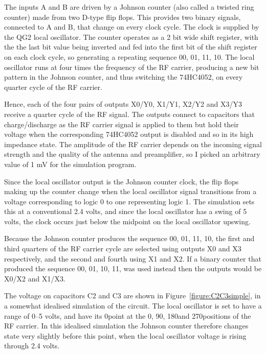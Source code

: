 \documentclass[11pt, twoside]{article}
\begin{document}
The inputs A and B are driven by a Johnson counter (also called a
twisted ring counter) made from two D-type flip flops.  This provides
two binary signals, connected to A and B, that change on every clock
cycle.  The clock is supplied by the QG2 local oscillator. The counter
operates as a 2 bit wide shift register, with the the last bit value
being inverted and fed into the first bit of the shift register on
each clock cycle, so generating a repeating sequence 00, 01, 11, 10.
The local oscillator runs at four times the frequency of the RF
carrier, producing a new bit pattern in the Johnson counter, and thus
switching the 74HC4052, on every quarter cycle of the RF carrier.

Hence, each of the four pairs of outputs X0/Y0, X1/Y1, X2/Y2 and X3/Y3
receive a quarter cycle of the RF signal.  The outputs connect to
capacitors that charge/discharge as the RF carrier signal is applied
to them but hold their voltage when the corresponding 74HC4052 output
is disabled and so in its high impedance state. The amplitude of the
RF carrier depends on the incoming signal strength and the quality of
the antenna and preamplifier, so I picked an arbitrary value of 1 mV
for the simulation program.

Since the local oscillator output is the Johnson counter clock, the
flip flops making up the counter change when the local oscillator
signal transitions from a voltage corresponding to logic 0 to one
representing logic 1.  The simulation sets this at a conventional 2.4
volts, and since the local oscillator has a swing of 5 volts, the
clock occurs just below the midpoint on the local oscillator upswing.

Because the Johnson counter produces the sequence 00, 01, 11, 10, the
first and third quarters of the RF carrier cycle are selected using
outputs X0 and X3 respectively, and the second and fourth using X1 and
X2.  If a binary counter that produced the sequence 00, 01, 10, 11,
was used instead then the outputs would be X0/X2 and X1/X3.

The voltage on capacitors C2 and C3 are shown in
Figure~\ref{figure:C2C3simple}, in a somewhat idealised simulation of
the circuit.  The local oscillator is set to have a range of 0--5
volts, and have its 0\degree point at the 0\degree, 90\degree,
180\degree and 270\degree positions of the RF carrier.  In this
idealised simulation the Johnson counter therefore changes state very
slightly before this point, when the local oscillator voltage is
rising through 2.4 volts.
\end{document}
